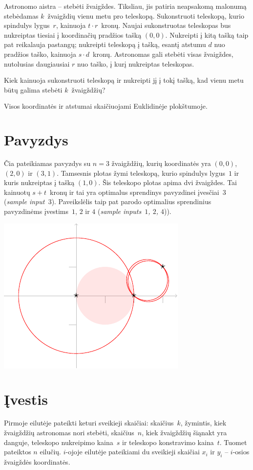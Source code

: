 
\noindent
Astronomo aistra -- stebėti žvaigždes.
Tiksliau, jis patiria neapsakomą malonumą stebėdamas $k$~žvaigždių vienu metu pro teleskopą.
Sukonstruoti teleskopą, kurio spindulys lygus~$r$, kainuoja $t\cdot r$~kronų.
Naujai sukonstruotas teleskopas bus nukreiptas tiesiai į koordinačių pradžios tašką $(0,0)$. 
Nukreipti į kitą tašką taip pat reikalauja pastangų;
nukreipti teleskopą į tašką, esantį atstumu $d$ nuo pradžios taško, kainuoja $s\cdot d$~kronų.
Astronomas gali stebėti visas žvaigždes, nutolusias daugiausiai $r$ nuo taško, 
į kurį nukreiptas teleskopas.

Kiek kainuoja sukonstruoti teleskopą ir nukreipti jį į tokį tašką, kad vienu metu būtų galima stebėti $k$~žvaigždžių?

\medskip

Visos koordinatės ir atstumai skaičiuojami Euklidinėje plokštumoje.


\section*{Pavyzdys}

Čia pateikiamas pavyzdys su $n=3$ žvaigždžių, kurių koordinatės yra $(0,0)$, $(2,0)$ ir $(3,1)$.
Tamsesnis plotas žymi teleskopą, kurio spindulys lygus~$1$ ir kuris nukreiptas į tašką $(1,0)$. Šis teleskopo plotas apima dvi žvaigždes. Tai kainuotų $s + t$~kronų ir tai yra optimalus sprendinys pavyzdinei įvesčiai~$3$ (\emph{sample input~$3$}).
Paveikslėlis taip pat parodo optimalius sprendinius pavyzdinėms įvestims~$1$, $2$ ir $4$ (\emph{sample inputs~$1$, $2$, $4$})).

\medskip
\noindent
\includegraphics[width=.3\textwidth]{img/samples.pdf}


\section*{Įvestis}

Pirmoje eilutėje pateikti keturi sveikieji skaičiai:
skaičius~$k$, žymintis, kiek žvaigždžių astronomas nori stebėti,
skaičius~$n$, kiek žvaigždžių šiąnakt yra danguje,
teleskopo nukreipimo kaina~$s$ ir
teleskopo konstravimo kaina~$t$.
Tuomet pateiktos $n$ eilučių. $i$-ojoje eilutėje pateikiami du sveikieji skaičiai $x_i$ ir $y_i$ -- 
$i$-osios žvaigždės koordinatės.

